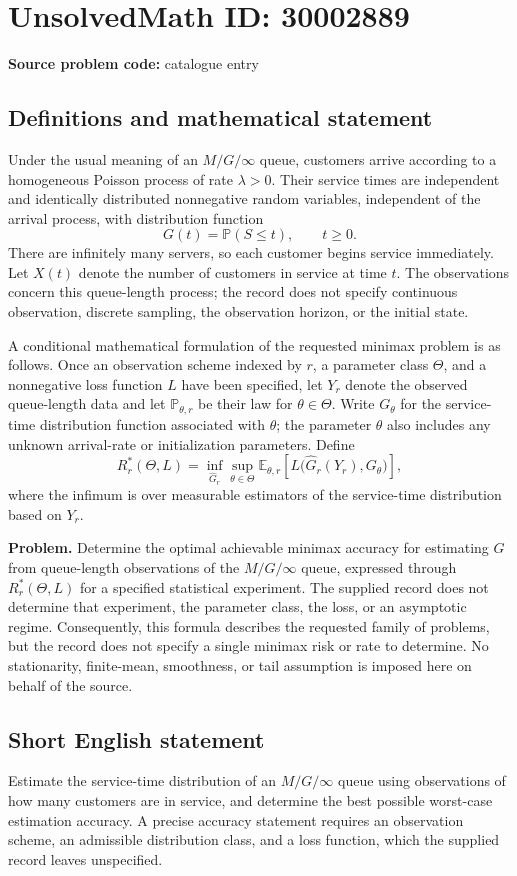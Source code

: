 \documentclass[11pt]{article}
\begin{document}
\section*{UnsolvedMath ID: 30002889}
\textbf{Source problem code:} catalogue entry
\subsection{Definitions and mathematical statement}
Under the usual meaning of an \(M/G/\infty\) queue, customers arrive according to a homogeneous Poisson process of rate \(\lambda>0\). Their service times are independent and identically distributed nonnegative random variables, independent of the arrival process, with distribution function
\[
G(t)=\mathbb{P}(S\leq t),\qquad t\geq0.
\]
There are infinitely many servers, so each customer begins service immediately. Let \(X(t)\) denote the number of customers in service at time \(t\). The observations concern this queue-length process; the record does not specify continuous observation, discrete sampling, the observation horizon, or the initial state.

A conditional mathematical formulation of the requested minimax problem is as follows. Once an observation scheme indexed by \(r\), a parameter class \(\Theta\), and a nonnegative loss function \(L\) have been specified, let \(Y_r\) denote the observed queue-length data and let \(\mathbb{P}_{\theta,r}\) be their law for \(\theta\in\Theta\). Write \(G_\theta\) for the service-time distribution function associated with \(\theta\); the parameter \(\theta\) also includes any unknown arrival-rate or initialization parameters. Define
\[
R_r^*(\Theta,L)
=
\inf_{\widehat G_r}\sup_{\theta\in\Theta}
\mathbb{E}_{\theta,r}\!\left[
L\bigl(\widehat G_r(Y_r),G_\theta\bigr)
\right],
\]
where the infimum is over measurable estimators of the service-time distribution based on \(Y_r\).

\textbf{Problem.} Determine the optimal achievable minimax accuracy for estimating \(G\) from queue-length observations of the \(M/G/\infty\) queue, expressed through \(R_r^*(\Theta,L)\) for a specified statistical experiment. The supplied record does not determine that experiment, the parameter class, the loss, or an asymptotic regime. Consequently, this formula describes the requested family of problems, but the record does not specify a single minimax risk or rate to determine. No stationarity, finite-mean, smoothness, or tail assumption is imposed here on behalf of the source.
\subsection{Short English statement}
Estimate the service-time distribution of an \(M/G/\infty\) queue using observations of how many customers are in service, and determine the best possible worst-case estimation accuracy. A precise accuracy statement requires an observation scheme, an admissible distribution class, and a loss function, which the supplied record leaves unspecified.
\end{document}
